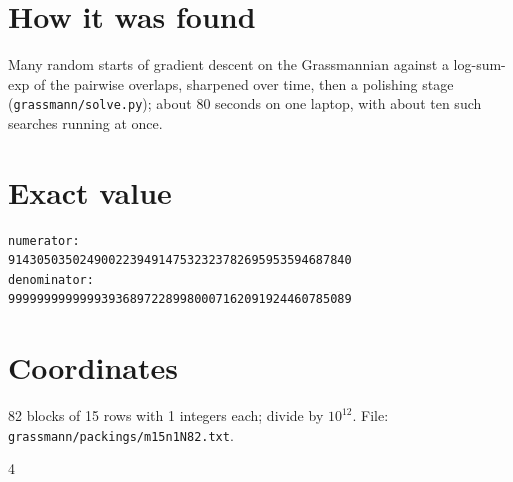 \documentclass[11pt,a4paper]{article}
\begin{document}
\section{How it was found}
Many random starts of gradient descent on the Grassmannian against a log-sum-exp of the pairwise overlaps, sharpened over time, then a polishing stage (\texttt{grassmann/solve.py}); about 80 seconds on one laptop, with about ten such searches running at once.


\appendix
\section{Exact value}
{\small
\begin{verbatim}
numerator:
914305035024900223949147532323782695953594687840
denominator:
999999999999939368972289980007162091924460785089
\end{verbatim}}

\section{Coordinates}
82 blocks of 15 rows with 1 integers each; divide by $10^{12}$. File: \texttt{grassmann/packings/m15n1N82.txt}.
{\tiny
\begin{multicols}{4}
\end{multicols}}
\end{document}
